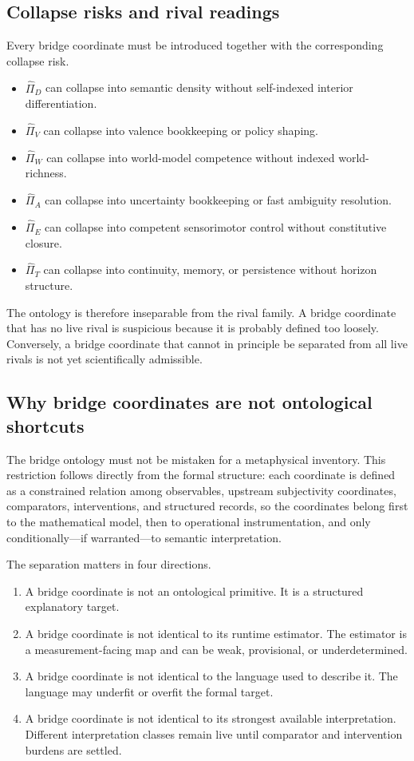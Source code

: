 \documentclass[11pt,a4paper]{article}
\theoremstyle{definition}
\begin{document}
\subsection{Collapse risks and rival readings}
Every bridge coordinate must be introduced together with the corresponding collapse risk.
\begin{itemize}[leftmargin=1.5em]
\item $\widehat{\Pi}_D$ can collapse into semantic density without self-indexed interior differentiation.
\item $\widehat{\Pi}_V$ can collapse into valence bookkeeping or policy shaping.
\item $\widehat{\Pi}_W$ can collapse into world-model competence without indexed world-richness.
\item $\widehat{\Pi}_A$ can collapse into uncertainty bookkeeping or fast ambiguity resolution.
\item $\widehat{\Pi}_E$ can collapse into competent sensorimotor control without constitutive closure.
\item $\widehat{\Pi}_T$ can collapse into continuity, memory, or persistence without horizon structure.
\end{itemize}
The ontology is therefore inseparable from the rival family. A bridge coordinate that has no live rival is suspicious because it is probably defined too loosely. Conversely, a bridge coordinate that cannot in principle be separated from all live rivals is not yet scientifically admissible.

\subsection{Why bridge coordinates are not ontological shortcuts}
The bridge ontology must not be mistaken for a metaphysical inventory. This restriction follows directly from the formal structure: each coordinate is defined as a constrained relation among observables, upstream subjectivity coordinates, comparators, interventions, and structured records, so the coordinates belong first to the mathematical model, then to operational instrumentation, and only conditionally---if warranted---to semantic interpretation.

The separation matters in four directions.
\begin{enumerate}[leftmargin=1.5em]
\item A bridge coordinate is not an ontological primitive. It is a structured explanatory target.
\item A bridge coordinate is not identical to its runtime estimator. The estimator is a measurement-facing map and can be weak, provisional, or underdetermined.
\item A bridge coordinate is not identical to the language used to describe it. The language may underfit or overfit the formal target.
\item A bridge coordinate is not identical to its strongest available interpretation. Different interpretation classes remain live until comparator and intervention burdens are settled.
\end{enumerate}
\end{document}

